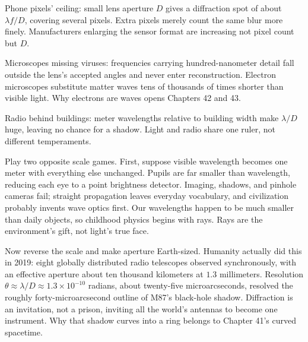 Phone pixels' ceiling: small lens aperture \(D\) gives a diffraction spot of about \(\lambda f/D\), covering several pixels. Extra pixels merely count the same blur more finely. Manufacturers enlarging the sensor format are increasing not pixel count but \(D\).

Microscopes missing viruses: frequencies carrying hundred-nanometer detail fall outside the lens's accepted angles and never enter reconstruction. Electron microscopes substitute matter waves tens of thousands of times shorter than visible light. Why electrons are waves opens Chapters 42 and 43.

Radio behind buildings: meter wavelengths relative to building width make \(\lambda/D\) huge, leaving no chance for a shadow. Light and radio share one ruler, not different temperaments.


\begin{thought}
Play two opposite scale games. First, suppose visible wavelength becomes one meter with everything else unchanged. Pupils are far smaller than wavelength, reducing each eye to a point brightness detector. Imaging, shadows, and pinhole cameras fail; straight propagation leaves everyday vocabulary, and civilization probably invents wave optics first. Our wavelengths happen to be much smaller than daily objects, so childhood physics begins with rays. Rays are the environment's gift, not light's true face.

Now reverse the scale and make aperture Earth-sized. Humanity actually did this in 2019: eight globally distributed radio telescopes observed synchronously, with an effective aperture about ten thousand kilometers at \(1.3\) millimeters. Resolution \(\theta\approx\lambda/D\approx1.3\times10^{-10}\) radians, about twenty-five microarcseconds, resolved the roughly forty-microarcsecond outline of M87's black-hole shadow. Diffraction is an invitation, not a prison, inviting all the world's antennas to become one instrument. Why that shadow curves into a ring belongs to Chapter 41's curved spacetime.
\end{thought}

